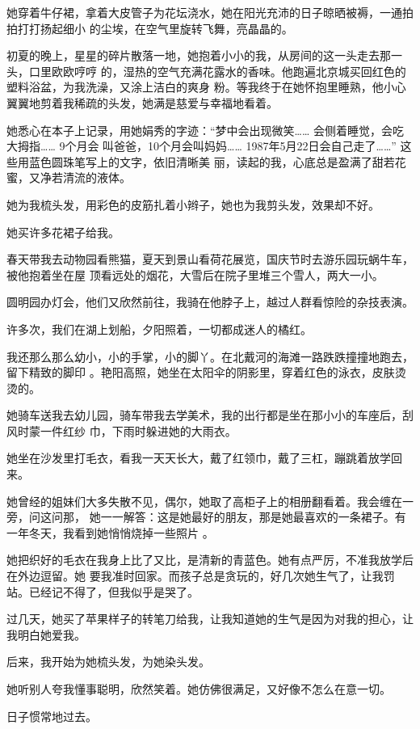 \documentclass[12pt,a4paper]{article}
\begin{document}
		她穿着牛仔裙，拿着大皮管子为花坛浇水，她在阳光充沛的日子晾晒被褥，一通拍拍打打扬起细小
	的尘埃，在空气里旋转飞舞，亮晶晶的。

		初夏的晚上，星星的碎片散落一地，她抱着小小的我，从房间的这一头走去那一头，口里欧欧哼哼
	的，湿热的空气充满花露水的香味。他跑遍北京城买回红色的塑料浴盆，为我洗澡，又涂上洁白的爽身
	粉。等我终于在她怀抱里睡熟，他小心翼翼地剪着我稀疏的头发，她满是慈爱与幸福地看着。


		她悉心在本子上记录，用她娟秀的字迹：“梦中会出现微笑…… 会侧着睡觉，会吃大拇指…… 9个月会
	叫爸爸，10个月会叫妈妈…… 1987年5月22日会自己走了……” 这些用蓝色圆珠笔写上的文字，依旧清晰美
	丽，读起的我，心底总是盈满了甜若花蜜，又净若清流的液体。


		她为我梳头发，用彩色的皮筋扎着小辫子，她也为我剪头发，效果却不好。

		她买许多花裙子给我。

		春天带我去动物园看熊猫，夏天到景山看荷花展览，国庆节时去游乐园玩蜗牛车，被他抱着坐在屋
	顶看远处的烟花，大雪后在院子里堆三个雪人，两大一小。

		圆明园办灯会，他们又欣然前往，我骑在他脖子上，越过人群看惊险的杂技表演。

		许多次，我们在湖上划船，夕阳照着，一切都成迷人的橘红。

		我还那么那么幼小，小的手掌，小的脚丫。在北戴河的海滩一路跌跌撞撞地跑去，留下精致的脚印
	。艳阳高照，她坐在太阳伞的阴影里，穿着红色的泳衣，皮肤烫烫的。

		她骑车送我去幼儿园，骑车带我去学美术，我的出行都是坐在那小小的车座后，刮风时蒙一件红纱
	巾，下雨时躲进她的大雨衣。


		她坐在沙发里打毛衣，看我一天天长大，戴了红领巾，戴了三杠，蹦跳着放学回来。

		她曾经的姐妹们大多失散不见，偶尔，她取了高柜子上的相册翻看着。我会缠在一旁，问这问那，
	她一一解答：这是她最好的朋友，那是她最喜欢的一条裙子。有一年冬天，我看到她悄悄烧掉一些照片
	。

		她把织好的毛衣在我身上比了又比，是清新的青蓝色。她有点严厉，不准我放学后在外边逗留。她
	要我准时回家。而孩子总是贪玩的，好几次她生气了，让我罚站。已经记不得了，但我似乎是哭了。

		过几天，她买了苹果样子的转笔刀给我，让我知道她的生气是因为对我的担心，让我明白她爱我。

		后来，我开始为她梳头发，为她染头发。


		她听别人夸我懂事聪明，欣然笑着。她仿佛很满足，又好像不怎么在意一切。

		日子惯常地过去。
\end{document}

